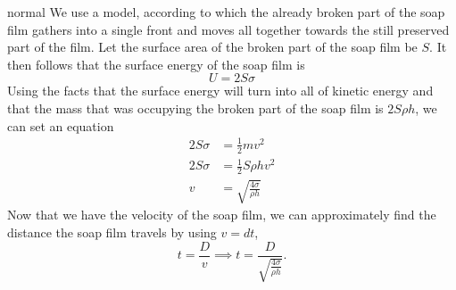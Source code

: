 \begin{solution}{normal}
We use a model, according to which the already broken part of the soap film gathers into a single front and moves all together towards the still preserved part of the film. Let the surface area of the broken part of the soap film be $S$. It then follows that the surface energy of the soap film is 
\[U = 2S\sigma\]
Using the facts that the surface energy will turn into all of kinetic energy and that the mass that was occupying the broken part of the soap film is $2S\rho h$, we can set an equation 
\begin{align*}
2S\sigma&=\frac{1}{2}mv^2\\
2S\sigma&=\frac{1}{2}S\rho h v^2\\
v&=\sqrt{\frac{4\sigma}{\rho h}}
\end{align*}
Now that we have the velocity of the soap film, we can approximately find the distance the soap film travels by using $v=dt$,
\[t = \frac{D}{v}\implies t = \dfrac{D}{\sqrt{\frac{4\sigma}{\rho h}}}.\]
\end{solution}